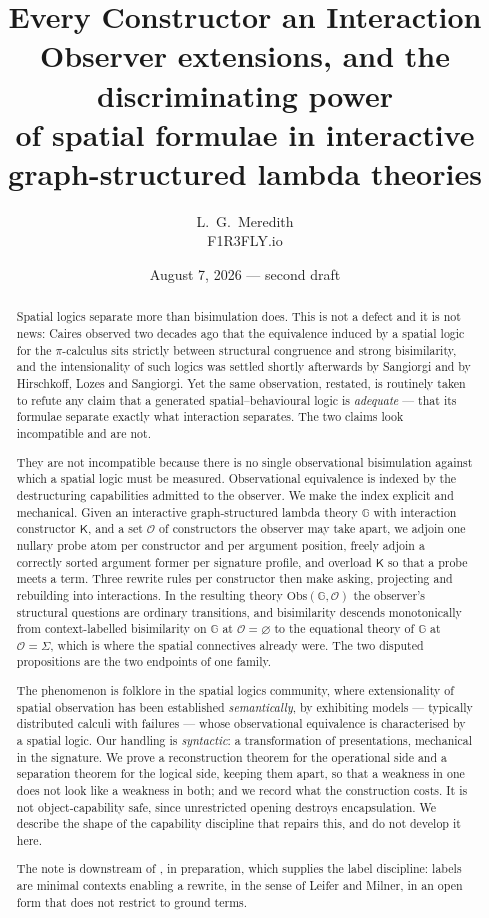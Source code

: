 \documentclass[11pt]{article}
\title{\bfseries Every Constructor an Interaction\\[.35em]
\large Observer extensions, and the discriminating power\\
of spatial formulae in interactive graph-structured lambda theories}
\author{L.\ G.\ Meredith\\ \small F1R3FLY.io}
\date{August 7, 2026 --- second draft}
\theoremstyle{plain}
\theoremstyle{definition}
\newcommand{\Kc}{\mathsf{K}}
\newcommand{\Gg}{\mathbb{G}}
\newcommand{\Obs}{\mathrm{Obs}}
\newcommand{\Ob}{\mathcal{O}}
\begin{document}
\maketitle

\begin{abstract}
Spatial logics separate more than bisimulation does. This is not a defect and it is not news: Caires
observed two decades ago that the equivalence induced by a spatial logic for the $\pi$-calculus sits
strictly between structural congruence and strong bisimilarity, and the intensionality of such logics
was settled shortly afterwards by Sangiorgi and by Hirschkoff, Lozes and Sangiorgi. Yet the same
observation, restated, is routinely taken to refute any claim that a generated spatial--behavioural
logic is \emph{adequate} --- that its formulae separate exactly what interaction separates. The two
claims look incompatible and are not.

They are not incompatible because there is no single observational bisimulation against which a
spatial logic must be measured. Observational equivalence is indexed by the destructuring capabilities
admitted to the observer. We make the index explicit and mechanical. Given an interactive
graph-structured lambda theory $\Gg$ with interaction constructor $\Kc$, and a set $\Ob$ of
constructors the observer may take apart, we adjoin one nullary probe atom per constructor and per
argument position, freely adjoin a correctly sorted argument former per signature profile, and overload
$\Kc$ so that a probe meets a term. Three rewrite rules per constructor then make asking, projecting
and rebuilding into interactions. In the resulting theory $\Obs(\Gg,\Ob)$ the observer's structural
questions are ordinary transitions, and bisimilarity descends monotonically from context-labelled
bisimilarity on $\Gg$ at $\Ob = \varnothing$ to the equational theory of $\Gg$ at $\Ob = \Sigma$,
which is where the spatial connectives already were. The two disputed propositions are the two
endpoints of one family.

The phenomenon is folklore in the spatial logics community, where extensionality of spatial
observation has been established \emph{semantically}, by exhibiting models --- typically distributed
calculi with failures --- whose observational equivalence is characterised by a spatial logic. Our
handling is \emph{syntactic}: a transformation of presentations, mechanical in the signature. We prove
a reconstruction theorem for the operational side and a separation theorem for the logical side, keeping
them apart, so that a weakness in one does not look like a weakness in both; and we record what the
construction costs. It is not object-capability safe, since unrestricted opening destroys
encapsulation. We describe the shape of the capability discipline that repairs this, and do not develop
it here.

The note is downstream of \cite{BIHOL}, in preparation, which supplies the label discipline: labels are
minimal contexts enabling a rewrite, in the sense of Leifer and Milner, in an open form that does not
restrict to ground terms.
\end{abstract}
\end{document}
